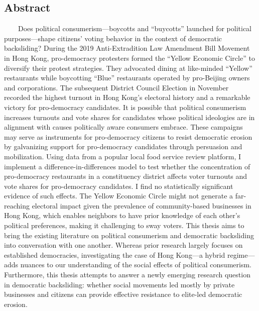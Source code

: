 \documentclass[letterpaper, 12pt]{article}
\begin{document}
\begin{titlepage}
\section*{\centering \small Abstract}
\fontsize{11}{12}\selectfont
~~~~Does political consumerism---boycotts and ``buycotts'' launched for political purposes---shape citizens' voting behavior in the context of democratic backsliding? During the 2019 Anti-Extradition Law Amendment Bill Movement in Hong Kong, pro-democracy protesters formed the ``Yellow Economic Circle'' to diversify their protest strategies. They advocated dining at like-minded ``Yellow'' restaurants while boycotting ``Blue'' restaurants operated by pro-Beijing owners and corporations. The subsequent District Council Election in November recorded the highest turnout in Hong Kong's electoral history and a remarkable victory for pro-democracy candidates. It is possible that political consumerism increases turnouts and vote shares for candidates whose political ideologies are in alignment with causes politically aware consumers embrace. These campaigns may serve as instruments for pro-democracy citizens to resist democratic erosion by galvanizing support for pro-democracy candidates through persuasion and mobilization. Using data from a popular local food service review platform, I implement a difference-in-differences model to test whether the concentration of pro-democracy restaurants in a constituency district affects voter turnouts and vote shares for pro-democracy candidates. I find no statistically significant evidence of such effects. The Yellow Economic Circle might not generate a far-reaching electoral impact given the prevalence of community-based businesses in Hong Kong, which enables neighbors to have prior knowledge of each other's political preferences, making it challenging to sway voters. This thesis aims to bring the existing literature on political consumerism and democratic backsliding into conversation with one another. Whereas prior research largely focuses on established democracies, investigating the case of Hong Kong---a hybrid regime---adds nuances to our understanding of the social effects of political consumerism. Furthermore, this thesis attempts to answer a newly emerging research question in democratic backsliding: whether social movements led mostly by private businesses and citizens can provide effective resistance to elite-led democratic erosion.



\end{titlepage}
\end{document}

